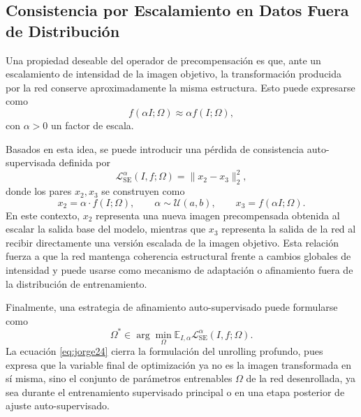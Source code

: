 \documentclass[conference]{IEEEtran}
\begin{document}
\subsection{Consistencia por Escalamiento en Datos Fuera de Distribución}
Una propiedad deseable del operador de precompensación es que, ante un escalamiento de intensidad de la imagen objetivo, la transformación producida por la red conserve aproximadamente la misma estructura. Esto puede expresarse como
\begin{equation}
f(\alpha I;\Omega)\approx \alpha f(I;\Omega),
\label{eq:jorge21}
\end{equation}
con $\alpha>0$ un factor de escala.

Basados en esta idea, se puede introducir una pérdida de consistencia auto-supervisada definida por
\begin{equation}
\mathcal{L}_{\mathrm{SE}}^{\alpha}(I,f;\Omega)
=
\|x_2-x_3\|_2^2,
\label{eq:jorge22}
\end{equation}
donde los pares $x_2,x_3$ se construyen como
\begin{equation}
x_2=\alpha\cdot f(I;\Omega),
\qquad
\alpha\sim\mathcal{U}(a,b),
\qquad
x_3=f(\alpha I;\Omega).
\label{eq:jorge23}
\end{equation}
En este contexto, $x_2$ representa una nueva imagen precompensada obtenida al escalar la salida base del modelo, mientras que $x_3$ representa la salida de la red al recibir directamente una versión escalada de la imagen objetivo. Esta relación fuerza a que la red mantenga coherencia estructural frente a cambios globales de intensidad y puede usarse como mecanismo de adaptación o afinamiento fuera de la distribución de entrenamiento.

Finalmente, una estrategia de afinamiento auto-supervisado puede formularse como
\begin{equation}
\Omega^\ast
\in
\arg\min_{\Omega}
\mathbb{E}_{I,\alpha}
\mathcal{L}_{\mathrm{SE}}^{\alpha}(I,f;\Omega).
\label{eq:jorge24}
\end{equation}
La ecuación \eqref{eq:jorge24} cierra la formulación del unrolling profundo, pues expresa que la variable final de optimización ya no es la imagen transformada en sí misma, sino el conjunto de parámetros entrenables $\Omega$ de la red desenrollada, ya sea durante el entrenamiento supervisado principal o en una etapa posterior de ajuste auto-supervisado.
\end{document}
